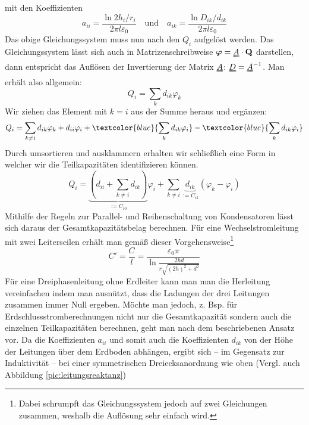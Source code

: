 mit den Koeffizienten
\begin{equation}
a_{ii} = \frac{\ln 2h_i/r_i}{2\pi l \varepsilon_0} \quad \textrm{und} \quad a_{ik} = \frac{\ln D_{ik}/d_{ik}}{2\pi l \varepsilon_0}
\end{equation}
Das obige Gleichungssystem muss nun nach den $Q_i$ aufgelöst werden. Das Gleichungssystem lässt sich auch in Matrizenschreibweise $\boldsymbol{\varphi} = \uuline{A} \cdot \mathbf{Q}$ darstellen, dann entspricht das Auflösen der Invertierung der Matrix $\uuline{A}$: $\uuline{D}=\uuline{A}^{-1}$. Man erhält also allgemein:
\begin{equation}
Q_i = \sum_k d_{ik}\varphi_k
\end{equation}
Wir ziehen das Element mit $k=i$ aus der Summe heraus und ergänzen:
\begin{equation}
Q_i = \sum_{k\neq i} d_{ik}\varphi_k + d_{ii}\varphi_i + \textcolor{blue}{\sum_k d_{ik}\varphi_i} - \textcolor{blue}
{\sum_k d_{ik}\varphi_i}
\end{equation}
Durch umsortieren und ausklammern erhalten wir schließlich eine Form in welcher wir die Teilkapazitäten identifizieren können.
\begin{equation}
Q_i = \underbrace{\left(d_{ii}+\sum_{k\neq i}d_{ik}\right)}_{:=C_{i0}}\varphi_i + \sum_{k\neq i} \underbrace{d_{ik}}_{:=C_{ik}} \left( \varphi_k - \varphi_i \right)
\end{equation}
Mithilfe der Regeln zur Parallel- und Reihenschaltung von Kondensatoren lässt sich daraus der Gesamtkapazitätsbelag berechnen.
Für eine Wechselstromleitung mit zwei Leiterseilen erhält man gemäß dieser Vorgehensweise\footnote{Dabei schrumpft das Gleichungssystem jedoch auf zwei Gleichungen zusammen, weshalb die Auflösung sehr einfach wird.}
\begin{equation}
C' = \frac{C}{l} = \frac{\varepsilon_0\pi}{\ln{\frac{2hd}{r\sqrt{\left(2h\right)^2+d^2}}}}
\end{equation}
Für eine Dreiphasenleitung ohne Erdleiter kann man man die Herleitung vereinfachen indem man ausnützt, dass die Ladungen der drei Leitungen zusammen immer Null ergeben. Möchte man jedoch, z. Bsp. für  Erdschlussstromberechnungen nicht nur die Gesamtkapazität sondern auch die einzelnen Teilkapazitäten berechnen, geht man nach dem beschriebenen Ansatz vor.
Da die Koeffizienten $a_{ii}$ und somit auch die Koeffizienten $d_{ik}$ von der Höhe der Leitungen über dem Erdboden abhängen, ergibt sich -- im Gegensatz zur Induktivität -- bei einer symmetrischen Dreiecksanordnung wie oben (Vergl. auch Abbildung \ref{pic:leitungsreaktanz})
